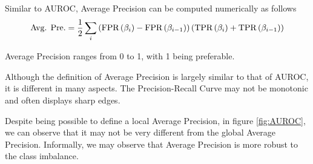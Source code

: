 Similar to AUROC, Average Precision can be computed numerically as follows
\begin{equation}
\text{Avg. Pre.} =
\frac{1}{2}
\sum_{i}
\left(  \text{FPR}\left( \beta_i \right)-\text{FPR}\left( \beta_{i-1} \right)  \right)
\left(  \text{TPR}\left( \beta_i \right)+\text{TPR}\left( \beta_{i-1} \right)  \right)
\end{equation}

Average Precision ranges from 0 to 1, with 1 being preferable.

Although the definition of Average Precision is largely similar to that of AUROC, it is different in many aspects.
%
The Precision-Recall Curve may not be monotonic and often displays sharp edges. 

Despite being possible to define a local Average Precision,  in figure \ref{fig:AUROC}, we can observe that it may not be very different from the global Average Precision.
%
Informally, we may observe that Average Precision is more robust to the class imbalance.